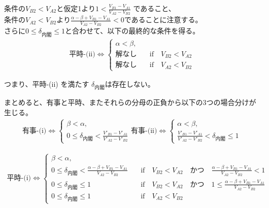 \documentclass[main.tex]{subfiles}
\begin{document}
\noindent
条件の$V_{B2} < V_{A2}$と仮定1より$1 < \frac{V_{B1} - V_{A1}}{V_{A2} - V_{B2}}$ であること、\\
条件の$V_{A2} < V_{B2}$より$\frac{\alpha-\beta + V_{B1}-V_{A1}}{V_{A2} - V_{B2}} < 0$であることに注意する。\\
さらに$0 \le \delta_{内閣} \le 1$と合わせて、以下の最終的な条件を得る。
\begin{align*}
    \text{平時-(ii)} \Leftrightarrow 
    \begin{cases}
        \alpha < \beta, \\
        解なし \quad&\text{if}\quad V_{B2} < V_{A2}\\
        解なし \quad&\text{if}\quad V_{A2} < V_{B2}
    \end{cases}
\end{align*}

\noindent
つまり、平時-(ii) を満たす $\delta_{内閣}$は存在しない。

\bigskip
まとめると、有事と平時、またそれらの分母の正負から以下の3つの場合分けが生じる。
\begin{align*}
    \text{有事-(i)} \Leftrightarrow 
    \begin{cases}
        \beta < \alpha, \\
        0 \le \delta_{内閣} < \frac{V'_{B1}-V'_{A1}}{V'_{A2} - V'_{B2}}
    \end{cases}
    \text{有事-(ii)} \Leftrightarrow 
    \begin{cases}
        \alpha < \beta, \\
        \frac{V'_{B1}-V'_{A1}}{V'_{A2} - V'_{B2}} < \delta_{内閣} \le 1
    \end{cases}
\end{align*}

\begin{align*}
    \text{平時-(i)} \Leftrightarrow 
    \begin{cases}
        \beta < \alpha, \\
        0 \le \delta_{内閣} < \frac{\alpha-\beta + V_{B1}-V_{A1}}{V_{A2} - V_{B2}} \quad&\text{if}\quad V_{B2} < V_{A2} \quad{かつ}\quad \frac{\alpha-\beta + V_{B1}-V_{A1}}{V_{A2} - V_{B2}}<1\\
        0 \le \delta_{内閣} \le 1 \quad&\text{if}\quad V_{B2} < V_{A2} \quad{かつ}\quad 1 \le \frac{\alpha-\beta + V_{B1}-V_{A1}}{V_{A2} - V_{B2}}\\
        0 \le \delta_{内閣} \le 1 \quad&\text{if}\quad V_{A2} < V_{B2}
    \end{cases}
\end{align*}
\end{document}
